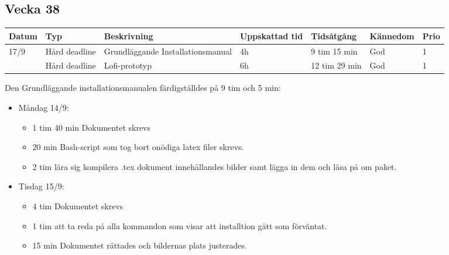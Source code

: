 \documentclass{TDP003mall}
\begin{document}
\newpage

\subsection{Vecka 38}
\begin{tabularx}{\linewidth}{|l|l|X|l|l|l|l|}
	\hline
	Datum & Typ           & Beskrivning                       & Uppskattad tid & Tidsåtgång    & Kännedom & Prio \\ [0.5ex]
	\hline                                                    
	17/9  & Hård deadline & Grundläggande Installationsmanual & 4h             & 9 tim 15 min  & God      & 1    \\
	\hline                                                    
          & Hård deadline & Lofi-prototyp                     & 6h             & 12 tim 29 min & God      & 1    \\
	\hline
\end{tabularx}

Den Grundläggande installationsmanualen färdigställdes på 9 tim och 5 min:
\begin{itemize}
	\item Måndag 14/9:
	\begin{itemize}
		\item 1 tim 40 min Dokumentet skrevs
		\item 20 min Bash-script som tog bort onödiga latex filer skrevs.
		\item 2 tim lära sig kompilera .tex dokument innehållandes bilder samt lägga in dem och läsa på om paket.
	\end{itemize}
	\item Tisdag 15/9:
	\begin{itemize}
		\item 4 tim Dokumentet skrevs
		\item 1 tim att ta reda på alla kommandon som visar att installtion gått som förväntat.
		\item 15 min Dokumentet rättades och bildernas plats justerades.\\
	\end{itemize}
\end{itemize}
\end{document}
